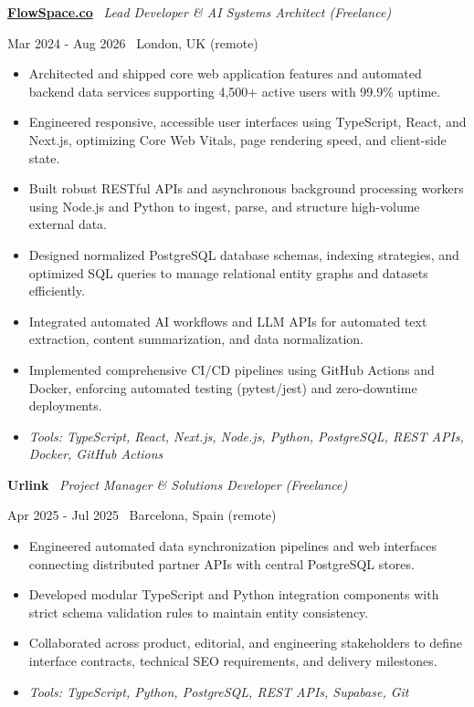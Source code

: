 \documentclass[a4paper,10pt]{article}
\newcommand{\role}[4]{%
  \vspace{2pt}\noindent
  \begin{minipage}[t]{0.70\textwidth}\raggedright\textbf{#1} \textbullet\ \textit{#3}\end{minipage}%
  \hfill
  \begin{minipage}[t]{0.28\textwidth}\raggedleft\footnotesize\color{gray}#2 \textbullet\ #4\end{minipage}%
  \vspace{1pt}%
}
\begin{document}
\role{\href{https://flowspace.co}{FlowSpace.co}}{Mar 2024 - Aug 2026}{Lead Developer \& AI Systems Architect (Freelance)}{London, UK (remote)}
\begin{itemize}
  \item Architected and shipped core web application features and automated backend data services supporting 4,500+ active users with 99.9\% uptime.
  \item Engineered responsive, accessible user interfaces using TypeScript, React, and Next.js, optimizing Core Web Vitals, page rendering speed, and client-side state.
  \item Built robust RESTful APIs and asynchronous background processing workers using Node.js and Python to ingest, parse, and structure high-volume external data.
  \item Designed normalized PostgreSQL database schemas, indexing strategies, and optimized SQL queries to manage relational entity graphs and datasets efficiently.
  \item Integrated automated AI workflows and LLM APIs for automated text extraction, content summarization, and data normalization.
  \item Implemented comprehensive CI/CD pipelines using GitHub Actions and Docker, enforcing automated testing (pytest/jest) and zero-downtime deployments.
  \item \textit{Tools: TypeScript, React, Next.js, Node.js, Python, PostgreSQL, REST APIs, Docker, GitHub Actions}
\end{itemize}

\role{Urlink}{Apr 2025 - Jul 2025}{Project Manager \& Solutions Developer (Freelance)}{Barcelona, Spain (remote)}
\begin{itemize}
  \item Engineered automated data synchronization pipelines and web interfaces connecting distributed partner APIs with central PostgreSQL stores.
  \item Developed modular TypeScript and Python integration components with strict schema validation rules to maintain entity consistency.
  \item Collaborated across product, editorial, and engineering stakeholders to define interface contracts, technical SEO requirements, and delivery milestones.
  \item \textit{Tools: TypeScript, Python, PostgreSQL, REST APIs, Supabase, Git}
\end{itemize}
\end{document}
